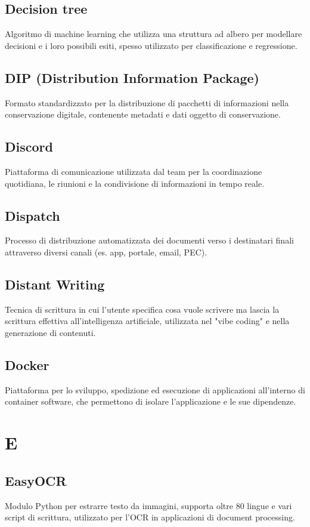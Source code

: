 \documentclass[a4paper,11pt]{article}
\begin{document}
\subsection{Decision tree}
Algoritmo di machine learning che utilizza una struttura ad albero per modellare decisioni e i loro possibili esiti, spesso utilizzato per classificazione e regressione.

\subsection{DIP (Distribution Information Package)}
Formato standardizzato per la distribuzione di pacchetti di informazioni nella conservazione digitale, contenente metadati e dati oggetto di conservazione.

\subsection{Discord}
Piattaforma di comunicazione utilizzata dal team per la coordinazione quotidiana, le riunioni e la condivisione di informazioni in tempo reale.

\subsection{Dispatch}
Processo di distribuzione automatizzata dei documenti verso i destinatari finali attraverso diversi canali (es. app, portale, email, PEC).

\subsection{Distant Writing}
Tecnica di scrittura in cui l'utente specifica cosa vuole scrivere ma lascia la scrittura effettiva all'intelligenza artificiale, utilizzata nel "vibe coding" e nella generazione di contenuti.

\subsection{Docker}
Piattaforma per lo sviluppo, spedizione ed esecuzione di applicazioni all'interno di container software, che permettono di isolare l'applicazione e le sue dipendenze.

\newpage
\section{E}

\subsection{EasyOCR}
Modulo Python per estrarre testo da immagini, supporta oltre 80 lingue e vari script di scrittura, utilizzato per l'OCR in applicazioni di document processing.
\end{document}
